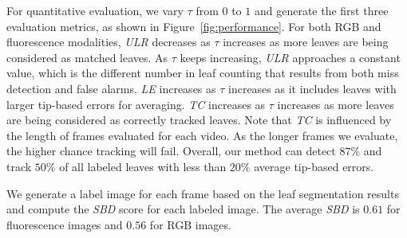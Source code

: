 For quantitative evaluation, we vary $\tau$ from $0$ to $1$ and generate the first three evaluation metrics, as shown in Figure~\ref{fig:performance}.
For both RGB and fluorescence modalities, {\it{ULR}} decreases as $\tau$ increases as more leaves are being considered as matched leaves.
As $\tau$ keeps increasing, {\it{ULR}} approaches a constant value, which is the different number in leaf counting that results from both miss detection and false alarms.
{\it{LE}} increases as $\tau$ increases as it includes leaves with larger tip-based errors for averaging.
{\it{TC}} increases as $\tau$ increases as more leaves are being considered as correctly tracked leaves.
Note that {\it{TC}} is influenced by the length of frames evaluated for each video.
As the longer frames we evaluate, the higher chance tracking will fail.
Overall, our method can detect $87\%$ and track $50\%$ of all labeled leaves with less than $20\%$ average tip-based errors.

We generate a label image for each frame based on the leaf segmentation results and compute the {\it{SBD}} score for each labeled image.
The average {\it{SBD}} is $0.61$ for fluorescence images and $0.56$ for RGB images. 







